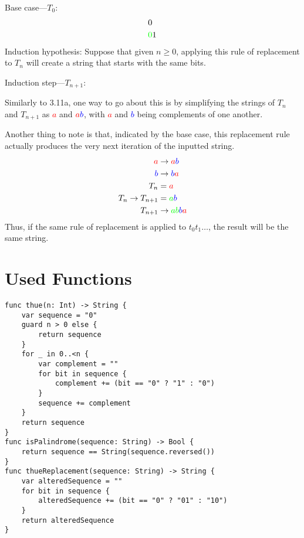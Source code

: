 \documentclass{article}
\begin{document}
Base case---$T_0$:
\begin{align*}
  &0\\
  &\textcolor{green}{0}1
\end{align*}
Induction hypothesis: Suppose that given $n\geq0$, applying this rule of replacement to $T_n$ will create a string that starts with the same bits.

Induction step---$T_{n+1}$:

Similarly to 3.11a, one way to go about this is by simplifying the strings of $T_n$ and $T_{n+1}$ as \textcolor{red}{$a$} and $\textcolor{red}{a}\textcolor{blue}{b}$, with \textcolor{red}{$a$} and \textcolor{blue}{$b$} being complements of one another.

Another thing to note is that, indicated by the base case, this replacement rule actually produces the very next iteration of the inputted string.
\begin{align*}
  \textcolor{red}{a}&\rightarrow \textcolor{red}{a}\textcolor{blue}{b}\\
  \textcolor{blue}{b}&\rightarrow \textcolor{blue}{b}\textcolor{red}{a}\\
  T_n&=\textcolor{red}{a}\\
  T_n\rightarrow T_{n+1}&=\textcolor{green}{a}\textcolor{blue}{b}\\
  T_{n+1}&\rightarrow \textcolor{green}{ab}\textcolor{blue}{b}\textcolor{red}{a}
\end{align*}
Thus, if the same rule of replacement is applied to $t_0t_1\ldots$, the result will be the same string.
\section*{Used Functions}
\begin{verbatim}
func thue(n: Int) -> String {
    var sequence = "0"
    guard n > 0 else {
        return sequence
    }
    for _ in 0..<n {
        var complement = ""
        for bit in sequence {
            complement += (bit == "0" ? "1" : "0")
        }
        sequence += complement
    }
    return sequence
}
func isPalindrome(sequence: String) -> Bool {
    return sequence == String(sequence.reversed())
}
func thueReplacement(sequence: String) -> String {
    var alteredSequence = ""
    for bit in sequence {
        alteredSequence += (bit == "0" ? "01" : "10")
    }
    return alteredSequence
}
\end{verbatim}
\end{document}
